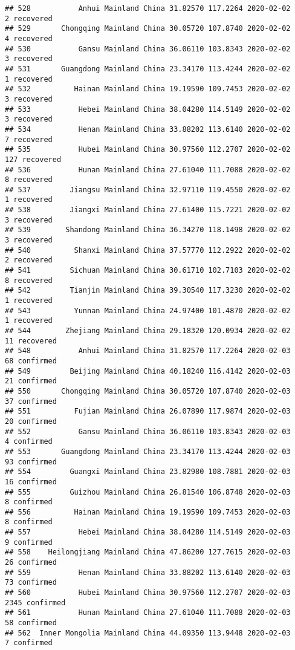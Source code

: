 \documentclass[
]{article}
\begin{document}
\begin{verbatim}
## 528           Anhui Mainland China 31.82570 117.2264 2020-02-02     2 recovered
## 529       Chongqing Mainland China 30.05720 107.8740 2020-02-02     4 recovered
## 530           Gansu Mainland China 36.06110 103.8343 2020-02-02     3 recovered
## 531       Guangdong Mainland China 23.34170 113.4244 2020-02-02     1 recovered
## 532          Hainan Mainland China 19.19590 109.7453 2020-02-02     3 recovered
## 533           Hebei Mainland China 38.04280 114.5149 2020-02-02     3 recovered
## 534           Henan Mainland China 33.88202 113.6140 2020-02-02     7 recovered
## 535           Hubei Mainland China 30.97560 112.2707 2020-02-02   127 recovered
## 536           Hunan Mainland China 27.61040 111.7088 2020-02-02     8 recovered
## 537         Jiangsu Mainland China 32.97110 119.4550 2020-02-02     1 recovered
## 538         Jiangxi Mainland China 27.61400 115.7221 2020-02-02     3 recovered
## 539        Shandong Mainland China 36.34270 118.1498 2020-02-02     3 recovered
## 540          Shanxi Mainland China 37.57770 112.2922 2020-02-02     2 recovered
## 541         Sichuan Mainland China 30.61710 102.7103 2020-02-02     8 recovered
## 542         Tianjin Mainland China 39.30540 117.3230 2020-02-02     1 recovered
## 543          Yunnan Mainland China 24.97400 101.4870 2020-02-02     1 recovered
## 544        Zhejiang Mainland China 29.18320 120.0934 2020-02-02    11 recovered
## 548           Anhui Mainland China 31.82570 117.2264 2020-02-03    68 confirmed
## 549         Beijing Mainland China 40.18240 116.4142 2020-02-03    21 confirmed
## 550       Chongqing Mainland China 30.05720 107.8740 2020-02-03    37 confirmed
## 551          Fujian Mainland China 26.07890 117.9874 2020-02-03    20 confirmed
## 552           Gansu Mainland China 36.06110 103.8343 2020-02-03     4 confirmed
## 553       Guangdong Mainland China 23.34170 113.4244 2020-02-03    93 confirmed
## 554         Guangxi Mainland China 23.82980 108.7881 2020-02-03    16 confirmed
## 555         Guizhou Mainland China 26.81540 106.8748 2020-02-03     8 confirmed
## 556          Hainan Mainland China 19.19590 109.7453 2020-02-03     8 confirmed
## 557           Hebei Mainland China 38.04280 114.5149 2020-02-03     9 confirmed
## 558    Heilongjiang Mainland China 47.86200 127.7615 2020-02-03    26 confirmed
## 559           Henan Mainland China 33.88202 113.6140 2020-02-03    73 confirmed
## 560           Hubei Mainland China 30.97560 112.2707 2020-02-03  2345 confirmed
## 561           Hunan Mainland China 27.61040 111.7088 2020-02-03    58 confirmed
## 562  Inner Mongolia Mainland China 44.09350 113.9448 2020-02-03     7 confirmed

\end{verbatim}
\end{document}
